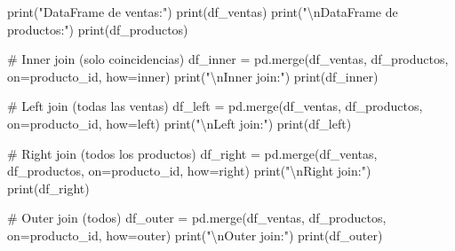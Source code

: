 \documentclass[
  doc,
  floatsintext,
  longtable,
  a4paper,
  nolmodern,
  notxfonts,
  notimes,
  12pt,
  colorlinks=true,linkcolor=blue,citecolor=blue,urlcolor=blue]{apa7}
\newenvironment{Shaded}{\begin{snugshade}}{\end{snugshade}}
\newcommand{\BuiltInTok}[1]{\textcolor[rgb]{0.00,0.23,0.31}{#1}}
\newcommand{\CharTok}[1]{\textcolor[rgb]{0.13,0.47,0.30}{#1}}
\newcommand{\CommentTok}[1]{\textcolor[rgb]{0.37,0.37,0.37}{#1}}
\newcommand{\NormalTok}[1]{\textcolor[rgb]{0.00,0.23,0.31}{#1}}
\newcommand{\OperatorTok}[1]{\textcolor[rgb]{0.37,0.37,0.37}{#1}}
\newcommand{\StringTok}[1]{\textcolor[rgb]{0.13,0.47,0.30}{#1}}
\begin{document}
\begin{Shaded}
\begin{Highlighting}[]
\BuiltInTok{print}\NormalTok{(}\StringTok{"DataFrame de ventas:"}\NormalTok{)}
\BuiltInTok{print}\NormalTok{(df\_ventas)}
\BuiltInTok{print}\NormalTok{(}\StringTok{"}\CharTok{\textbackslash{}n}\StringTok{DataFrame de productos:"}\NormalTok{)}
\BuiltInTok{print}\NormalTok{(df\_productos)}

\CommentTok{\# Inner join (solo coincidencias)}
\NormalTok{df\_inner }\OperatorTok{=}\NormalTok{ pd.merge(df\_ventas, df\_productos, on}\OperatorTok{=}\StringTok{\textquotesingle{}producto\_id\textquotesingle{}}\NormalTok{, how}\OperatorTok{=}\StringTok{\textquotesingle{}inner\textquotesingle{}}\NormalTok{)}
\BuiltInTok{print}\NormalTok{(}\StringTok{"}\CharTok{\textbackslash{}n}\StringTok{Inner join:"}\NormalTok{)}
\BuiltInTok{print}\NormalTok{(df\_inner)}

\CommentTok{\# Left join (todas las ventas)}
\NormalTok{df\_left }\OperatorTok{=}\NormalTok{ pd.merge(df\_ventas, df\_productos, on}\OperatorTok{=}\StringTok{\textquotesingle{}producto\_id\textquotesingle{}}\NormalTok{, how}\OperatorTok{=}\StringTok{\textquotesingle{}left\textquotesingle{}}\NormalTok{)}
\BuiltInTok{print}\NormalTok{(}\StringTok{"}\CharTok{\textbackslash{}n}\StringTok{Left join:"}\NormalTok{)}
\BuiltInTok{print}\NormalTok{(df\_left)}

\CommentTok{\# Right join (todos los productos)}
\NormalTok{df\_right }\OperatorTok{=}\NormalTok{ pd.merge(df\_ventas, df\_productos, on}\OperatorTok{=}\StringTok{\textquotesingle{}producto\_id\textquotesingle{}}\NormalTok{, how}\OperatorTok{=}\StringTok{\textquotesingle{}right\textquotesingle{}}\NormalTok{)}
\BuiltInTok{print}\NormalTok{(}\StringTok{"}\CharTok{\textbackslash{}n}\StringTok{Right join:"}\NormalTok{)}
\BuiltInTok{print}\NormalTok{(df\_right)}

\CommentTok{\# Outer join (todos)}
\NormalTok{df\_outer }\OperatorTok{=}\NormalTok{ pd.merge(df\_ventas, df\_productos, on}\OperatorTok{=}\StringTok{\textquotesingle{}producto\_id\textquotesingle{}}\NormalTok{, how}\OperatorTok{=}\StringTok{\textquotesingle{}outer\textquotesingle{}}\NormalTok{)}
\BuiltInTok{print}\NormalTok{(}\StringTok{"}\CharTok{\textbackslash{}n}\StringTok{Outer join:"}\NormalTok{)}
\BuiltInTok{print}\NormalTok{(df\_outer)}
\end{Highlighting}
\end{Shaded}
\end{document}
